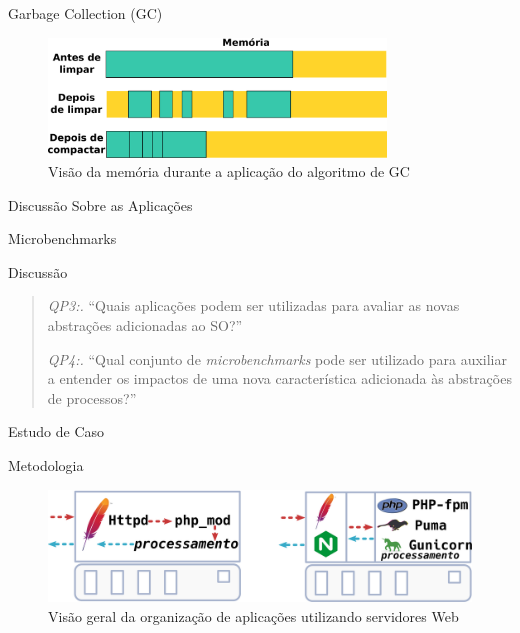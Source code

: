 \documentclass[xcolor={usenames,svgnames,dvipsnames},brazil,english,12pt,aspectratio=149]{beamer}
\begin{document}
\begin{frame}{Garbage Collection (GC)}
  \begin{figure}[!h]
    \centering
    \includegraphics[width=0.8\textwidth]{gc_memory}
    \caption{Visão da memória durante a aplicação do algoritmo de GC}
    \label{fig:gc_mem}
  \end{figure}
\end{frame}

\begin{frame}{Discussão Sobre as Aplicações}
  
\end{frame}

\begin{frame}{Microbenchmarks}
\end{frame}

\begin{frame}{Discussão}
  \begin{quote}
    \item \emph{QP3:.} ``Quais aplicações podem ser utilizadas para avaliar as novas abstrações adicionadas ao SO?''
    \item \emph{QP4:.} ``Qual conjunto de \emph{microbenchmarks} pode ser utilizado para auxiliar a entender os impactos de uma nova característica adicionada às abstrações de processos?''
  \end{quote}
\end{frame}

\begin{frame}{Estudo de Caso}
\end{frame}

\begin{frame}{Metodologia}
  \begin{figure}[!h] \centering
    \includegraphics[width=.60\textwidth]{web_server_organization_strategy}
    \caption{Visão geral da organização de aplicações utilizando servidores Web}
  \label{fig:web_server} \end{figure}
\end{frame}
\end{document}
